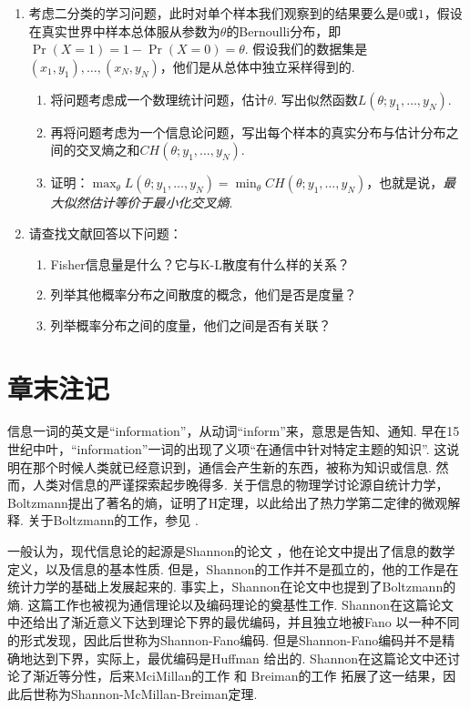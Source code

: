 \begin{enumerate}[wide, labelindent=0pt]
    \item 考虑二分类的学习问题，此时对单个样本我们观察到的结果要么是$0$或$1$，假设在真实世界中样本总体服从参数为$\theta$的Bernoulli分布，即$\Pr(X=1)=1-\Pr(X=0)=\theta$. 假设我们的数据集是$(x_1,y_1),\dots,(x_N,y_N)$，他们是从总体中独立采样得到的. 
    \begin{enumerate}
        \item 将问题考虑成一个数理统计问题，估计$\theta$. 写出似然函数$L(\theta;y_1,\dots,y_N)$.
        \item 再将问题考虑为一个信息论问题，写出每个样本的真实分布与估计分布之间的交叉熵之和$CH(\theta;y_1,\dots,y_N)$.
        \item 证明：$\max_{\theta} L(\theta;y_1,\dots,y_N)=\min_{\theta} CH(\theta;y_1,\dots,y_N)$，也就是说，\emph{最大似然估计等价于最小化交叉熵}.
    \end{enumerate}

    \item 请查找文献回答以下问题：
    \begin{enumerate}
        \item Fisher信息量是什么？它与K-L散度有什么样的关系？
        \item 列举其他概率分布之间散度的概念，他们是否是度量？
        \item 列举概率分布之间的度量，他们之间是否有关联？
    \end{enumerate}
    
\end{enumerate}
\section{章末注记}
信息一词的英文是“information”，从动词“inform”来，意思是告知、通知. 早在15世纪中叶，“information”一词的出现了义项“在通信中针对特定主题的知识”.\cite{InformationEtymologyOrigin} 这说明在那个时候人类就已经意识到，通信会产生新的东西，被称为知识或信息. 然而，人类对信息的严谨探索起步晚得多. 关于信息的物理学讨论源自统计力学，Boltzmann提出了著名的熵，证明了H定理，以此给出了热力学第二定律的微观解释. 关于Boltzmann的工作，参见 \cite{uffinkBoltzmannWorkStatistical2022}. 

一般认为，现代信息论的起源是Shannon的论文 \cite{shannonMathematicalTheoryCommunication1948}，他在论文中提出了信息的数学定义，以及信息的基本性质. 但是，Shannon的工作并不是孤立的，他的工作是在统计力学的基础上发展起来的. 事实上，Shannon在论文中也提到了Boltzmann的熵. 这篇工作也被视为通信理论以及编码理论的奠基性工作.  Shannon在这篇论文中还给出了渐近意义下达到理论下界的最优编码，并且独立地被Fano \cite{robertm.fanoTransmissionInformation1949} 以一种不同的形式发现，因此后世称为Shannon-Fano编码. 但是Shannon-Fano编码并不是精确地达到下界，实际上，最优编码是Huffman \cite{huffmanMethodConstructionMinimumRedundancy1952} 给出的. Shannon在这篇论文中还讨论了渐近等分性，后来MciMillan的工作 \cite{mcmillanBasicTheoremsInformation1953} 和 Breiman的工作 \cite{breimanIndividualErgodicTheorem1957} 拓展了这一结果，因此后世称为Shannon-McMillan-Breiman定理. 

